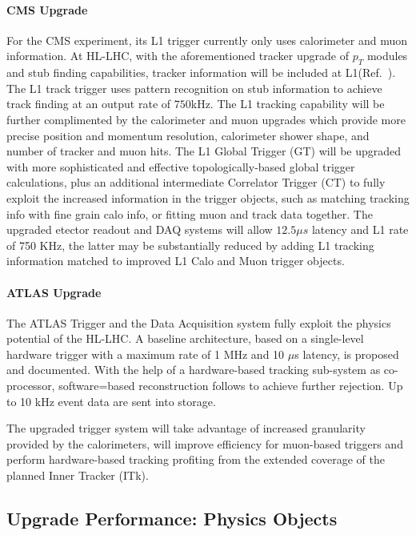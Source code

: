 \paragraph{CMS Upgrade} 
For the CMS experiment, its L1 trigger currently only uses calorimeter and muon information. At HL-LHC, with the aforementioned tracker upgrade of $p_T$ modules and stub finding capabilities, tracker information will be included at L1(Ref.~\cite{Lourenco:2283192}). 
The L1 track trigger uses pattern recognition on stub information to achieve track finding at an output rate of $750$kHz. 
The L1 tracking capability will be further complimented by the calorimeter and muon upgrades which provide more precise position and momentum resolution, calorimeter shower shape, and number of tracker and muon hits.
The L1 Global Trigger (GT) will be upgraded with more sophisticated and effective topologically-based global trigger calculations,
plus an additional intermediate Correlator Trigger (CT) to fully exploit the increased information in the trigger objects, such as matching tracking info with fine grain calo info, or fitting muon and track data together.
The upgraded etector readout and DAQ systems will allow $12.5 \mu s$ latency and L1 rate of 750 KHz, the latter may be substantially reduced by adding L1 tracking information matched to improved L1 Calo and Muon trigger objects.

\paragraph{ATLAS Upgrade}
The ATLAS Trigger and the Data Acquisition system  fully exploit the physics potential of the HL-LHC.
A baseline architecture, based on a single-level hardware trigger with a
maximum rate of 1 MHz and 10 $\mu$s latency, is proposed and documented. With
the help of a hardware-based tracking sub-system as co-processor, software=based
reconstruction follows to achieve further rejection. Up to 10 kHz event
data are sent into storage.

The upgraded trigger system will take advantage of increased granularity provided by the
calorimeters, will improve efficiency for muon-based triggers and perform hardware-based
tracking profiting from the extended coverage of the planned Inner Tracker (ITk). 



\subsection{Upgrade Performance: Physics Objects} \label{sec:upgradeobject}

